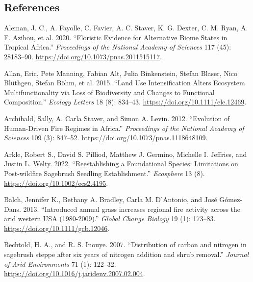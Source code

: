 \documentclass[
  12pt,
]{article}
\newlength{\cslhangindent}
\newlength{\cslentryspacingunit} %
\newenvironment{CSLReferences}[2] %
 {%
  \setlength{\parindent}{0pt}
  \ifodd #1
  \let\oldpar\par
  \def\par{\hangindent=\cslhangindent\oldpar}
  \fi
  \setlength{\parskip}{#2\cslentryspacingunit}
 }%
 {}
\begin{document}
\hypertarget{references}{%
\subsection{References}\label{references}}

\hypertarget{refs}{}
\begin{CSLReferences}{1}{0}
\leavevmode{}%
Aleman, J. C., A. Fayolle, C. Favier, A. C. Staver, K. G. Dexter, C. M.
Ryan, A. F. Azihou, et al. 2020. {``Floristic Evidence for Alternative
Biome States in Tropical {Africa}.''} \emph{Proceedings of the National
Academy of Sciences} 117 (45): 28183--90.
\url{https://doi.org/10.1073/pnas.2011515117}.

\leavevmode{}%
Allan, Eric, Pete Manning, Fabian Alt, Julia Binkenstein, Stefan Blaser,
Nico Blüthgen, Stefan Böhm, et al. 2015. {``Land Use Intensification
Alters Ecosystem Multifunctionality via Loss of Biodiversity and Changes
to Functional Composition.''} \emph{Ecology Letters} 18 (8): 834--43.
\url{https://doi.org/10.1111/ele.12469}.

\leavevmode{}%
Archibald, Sally, A. Carla Staver, and Simon A. Levin. 2012.
{``Evolution of Human-Driven Fire Regimes in {Africa}.''}
\emph{Proceedings of the National Academy of Sciences} 109 (3): 847--52.
\url{https://doi.org/10.1073/pnas.1118648109}.

\leavevmode{}%
Arkle, Robert S., David S. Pilliod, Matthew J. Germino, Michelle I.
Jeffries, and Justin L. Welty. 2022. {``Reestablishing a Foundational
Species: {Limitations} on Post‐wildfire Sagebrush Seedling
Establishment.''} \emph{Ecosphere} 13 (8).
\url{https://doi.org/10.1002/ecs2.4195}.

\leavevmode{}%
Balch, Jennifer K., Bethany A. Bradley, Carla M. D'Antonio, and José
Gómez-Dans. 2013. {``{Introduced annual grass increases regional fire
activity across the arid western USA (1980-2009)}.''} \emph{Global
Change Biology} 19 (1): 173--83.
\url{https://doi.org/10.1111/gcb.12046}.

\leavevmode{}%
Bechtold, H. A., and R. S. Inouye. 2007. {``{Distribution of carbon and
nitrogen in sagebrush steppe after six years of nitrogen addition and
shrub removal}.''} \emph{Journal of Arid Environments} 71 (1): 122--32.
\url{https://doi.org/10.1016/j.jaridenv.2007.02.004}.


\end{CSLReferences}
\end{document}
